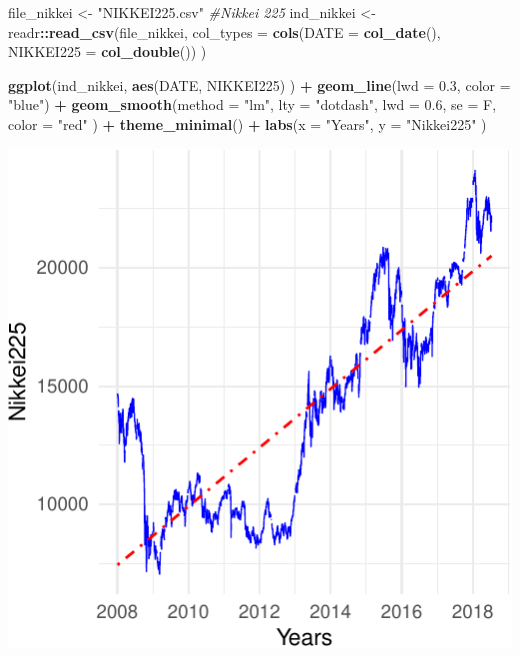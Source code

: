 \documentclass[11pt,]{article}
\newenvironment{Shaded}{\begin{snugshade}}{\end{snugshade}}
\newcommand{\KeywordTok}[1]{\textcolor[rgb]{0.13,0.29,0.53}{\textbf{#1}}}
\newcommand{\DataTypeTok}[1]{\textcolor[rgb]{0.13,0.29,0.53}{#1}}
\newcommand{\FloatTok}[1]{\textcolor[rgb]{0.00,0.00,0.81}{#1}}
\newcommand{\StringTok}[1]{\textcolor[rgb]{0.31,0.60,0.02}{#1}}
\newcommand{\CommentTok}[1]{\textcolor[rgb]{0.56,0.35,0.01}{\textit{#1}}}
\newcommand{\OperatorTok}[1]{\textcolor[rgb]{0.81,0.36,0.00}{\textbf{#1}}}
\newcommand{\NormalTok}[1]{#1}
\begin{document}
\begin{Shaded}
\begin{Highlighting}[]
\NormalTok{file_nikkei <-}\StringTok{ "NIKKEI225.csv"} \CommentTok{#Nikkei 225}
\NormalTok{ind_nikkei <-}\StringTok{ }\NormalTok{readr}\OperatorTok{::}\KeywordTok{read_csv}\NormalTok{(file_nikkei, }
                             \DataTypeTok{col_types =} \KeywordTok{cols}\NormalTok{(}\DataTypeTok{DATE =} \KeywordTok{col_date}\NormalTok{(), }
                                              \DataTypeTok{NIKKEI225 =} \KeywordTok{col_double}\NormalTok{())}
\NormalTok{                             )}

\KeywordTok{ggplot}\NormalTok{(ind_nikkei, }
       \KeywordTok{aes}\NormalTok{(DATE, NIKKEI225)}
\NormalTok{       ) }\OperatorTok{+}
\StringTok{  }\KeywordTok{geom_line}\NormalTok{(}\DataTypeTok{lwd =} \FloatTok{0.3}\NormalTok{, }
            \DataTypeTok{color =} \StringTok{"blue"}\NormalTok{) }\OperatorTok{+}
\StringTok{  }\KeywordTok{geom_smooth}\NormalTok{(}\DataTypeTok{method =} \StringTok{"lm"}\NormalTok{,}
              \DataTypeTok{lty =} \StringTok{"dotdash"}\NormalTok{,}
              \DataTypeTok{lwd =} \FloatTok{0.6}\NormalTok{,}
              \DataTypeTok{se =}\NormalTok{ F,}
              \DataTypeTok{color =} \StringTok{"red"}
\NormalTok{              ) }\OperatorTok{+}
\StringTok{  }\KeywordTok{theme_minimal}\NormalTok{() }\OperatorTok{+}
\StringTok{  }\KeywordTok{labs}\NormalTok{(}\DataTypeTok{x =} \StringTok{"Years"}\NormalTok{,}
       \DataTypeTok{y =} \StringTok{"Nikkei225"}
\NormalTok{       )}
\end{Highlighting}
\end{Shaded}

\begin{center}\includegraphics{FMC_T4_PhD_Fin_Time_Series_files/figure-latex/Nikkei-1} \end{center}
\end{document}
